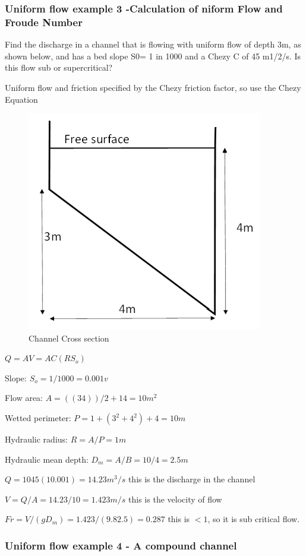 \documentclass[a4paper, 12pt, british]{article} %
\numberwithin{equation}{section}
\numberwithin{figure}{section}
\numberwithin{table}{section}
\begin{document}
\subsubsection{Uniform flow example 3 -Calculation of niform Flow and Froude Number}
Find the discharge in a channel that is flowing with uniform flow of depth 3m, as shown below, and has a bed slope S0=  1 in 1000 and a Chezy C of 45 m1/2/s. Is this flow sub or supercritical?

Uniform flow and friction specified by the Chezy friction factor, so use the Chezy Equation

	\begin{figure}[H]
	\centering
	\includegraphics[scale=0.5]{./images/fr_eg_01.png}
	\caption{Channel Cross section}
	\label{fig:fr_eg_01}
\end{figure}
$Q=AV=AC(RS_o )$

Slope: $S_o=1/1000=0.001v$

Flow area: $A=((3 4))/2+1 4=10 m^2$

Wetted perimeter: $P=1+(3^2+4^2 )+4=10m$

Hydraulic radius: $R=A/P=1m$

Hydraulic mean depth: $D_m=A/B=10/4=2.5m$

$Q=10 45(1 0.001)=14.23 m^3/s$ this is the discharge in the channel

$V=Q/A=14.23/10=1.423m/s$ this is the velocity of flow

$Fr=V/ (gD_m )=1.423/(9.8 2.5)=0.287$ this is $< 1$, so it is sub critical flow.

\subsubsection{Uniform flow example 4 - A compound channel}
\end{document}
